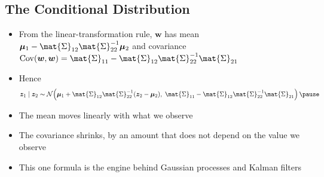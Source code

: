 \begin{slide}
\section[-2]{The Conditional Distribution}

\begin{PauseHighLight}
  \begin{itemize}
  \item From the linear-transformation rule, $\bm{w}$ has mean
    $\bm{\mu}_1 - \mat{\Sigma}_{12}\mat{\Sigma}_{22}^{-1}\bm{\mu}_2$ and
    covariance $\mathrm{Cov}(\bm{w}, \bm{w}) = \mat{\Sigma}_{11} -
    \mat{\Sigma}_{12}\mat{\Sigma}_{22}^{-1}\mat{\Sigma}_{21}$\pause
  \item Hence
    \begin{align*}
      \bm{z}_1\mid\bm{z}_2 \sim \mathcal{N}\!\left(
      \bm{\mu}_1 + \mat{\Sigma}_{12}\mat{\Sigma}_{22}^{-1}(\bm{z}_2-\bm{\mu}_2),\;
      \mat{\Sigma}_{11} - \mat{\Sigma}_{12}\mat{\Sigma}_{22}^{-1}\mat{\Sigma}_{21}
      \right)\pause
    \end{align*}
  \item The mean moves linearly with what we observe\pause
  \item The covariance shrinks, by an amount that does not depend on
    the value we observe\pause
  \item This one formula is the engine behind Gaussian processes and
    Kalman filters\pause
  \end{itemize}
\end{PauseHighLight}

\end{slide}


